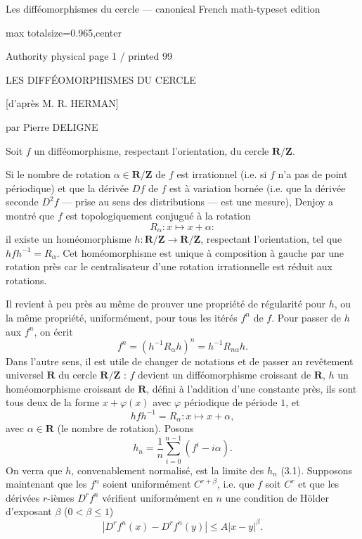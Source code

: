 \documentclass{article}
\begin{document}
\fontsize{8.35}{9.55}\selectfont
\begin{center}\scriptsize Les difféomorphismes du cercle --- canonical French math-typeset edition\end{center}

\noindent\begin{adjustbox}{max totalsize={\textwidth}{0.965\textheight},center}\begin{minipage}{\textwidth}
\noindent\hfill\scriptsize Authority physical page 1 / printed 99\par\normalsize
LES DIFFÉOMORPHISMES DU CERCLE

[d’après M. R. HERMAN]

par Pierre DELIGNE

Soit \(f\) un difféomorphisme, respectant l’orientation, du cercle \(\mathbf R/\mathbf Z\).

Si le nombre de rotation \(\alpha\in\mathbf R/\mathbf Z\) de \(f\) est irrationnel (i.e. si \(f\) n’a pas de point périodique) et que la dérivée \(Df\) de \(f\) est à variation bornée (i.e. que la dérivée seconde \(D^2f\) — prise au sens des distributions — est une mesure), Denjoy a montré que \(f\) est topologiquement conjugué à la rotation
\[
R_\alpha:x\longmapsto x+\alpha:
\]
il existe un homéomorphisme \(h:\mathbf R/\mathbf Z\to\mathbf R/\mathbf Z\), respectant l’orientation, tel que \(hfh^{-1}=R_\alpha\). Cet homéomorphisme est unique à composition à gauche par une rotation près car le centralisateur d’une rotation irrationnelle est réduit aux rotations.

Il revient à peu près au même de prouver une propriété de régularité pour \(h\), ou la même propriété, uniformément, pour tous les itérés \(f^n\) de \(f\). Pour passer de \(h\) aux \(f^n\), on écrit
\[
f^n=(h^{-1}R_\alpha h)^n=h^{-1}R_{n\alpha}h.
\]
Dans l’autre sens, il est utile de changer de notations et de passer au revêtement universel \(\mathbf R\) du cercle \(\mathbf R/\mathbf Z\) : \(f\) devient un difféomorphisme croissant de \(\mathbf R\), \(h\) un homéomorphisme croissant de \(\mathbf R\), défini à l’addition d’une constante près, ils sont tous deux de la forme \(x+\varphi(x)\) avec \(\varphi\) périodique de période \(1\), et
\[
hfh^{-1}=R_\alpha:x\longmapsto x+\alpha,
\]
avec \(\alpha\in\mathbf R\) (le nombre de rotation). Posons
\[
h_n=\frac1n\sum_{i=0}^{n-1}(f^i-i\alpha).
\]
On verra que \(h\), convenablement normalisé, est la limite des \(h_n\) (3.1). Supposons maintenant que les \(f^n\) soient uniformément \(C^{r+\beta}\), i.e. que \(f\) soit \(C^r\) et que les dérivées \(r\)-ièmes \(D^rf^n\) vérifient uniformément en \(n\) une condition de Hölder d’exposant \(\beta\) (\(0<\beta\leq1\))
\[
|D^rf^n(x)-D^rf^n(y)|\leq A|x-y|^\beta.
\]
\end{minipage}\end{adjustbox}
\end{document}
